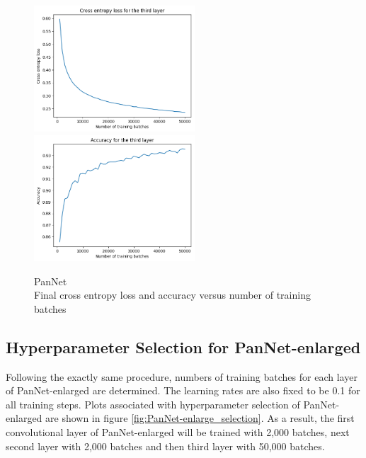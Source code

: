 \begin{figure}[th]
\centering
\includegraphics[width=60mm]{Figures/PanNet_search_parameters_3_loss}
\includegraphics[width=60mm]{Figures/PanNet_search_parameters_3_accuracy}
\decoRule
\caption{PanNet\\ Final cross entropy loss and accuracy versus number of training batches}
\label{fig:PanNet_search_parameters_3}
\end{figure}

\subsection{Hyperparameter Selection for PanNet-enlarged}

Following the exactly same procedure, numbers of training batches for each layer of PanNet-enlarged are determined. The learning rates are also fixed to be 0.1 for all training steps. Plots associated with hyperparameter selection of PanNet-enlarged are shown in figure \ref{fig:PanNet-enlarge_selection}. As a result, the first convolutional layer of PanNet-enlarged will be trained with 2,000 batches, next second layer with 2,000 batches and then third layer with 50,000 batches. 


